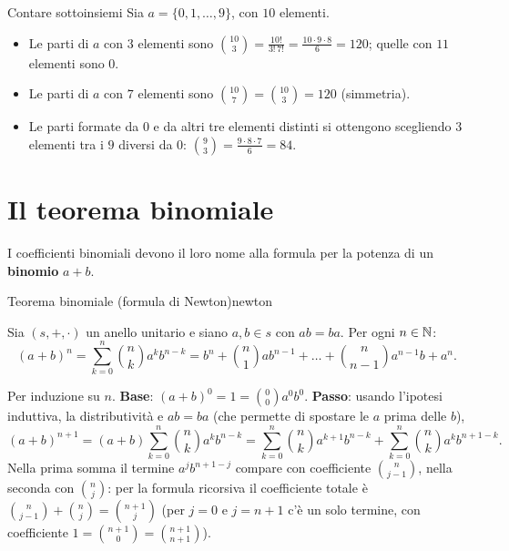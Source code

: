 \begin{esempio}{Contare sottoinsiemi}
    Sia $a = \{0, 1, \dots, 9\}$, con $10$ elementi.
    \begin{itemize}
        \item Le parti di $a$ con $3$ elementi sono $\binom{10}{3} = \frac{10!}{3!\,7!} = \frac{10 \cdot 9 \cdot 8}{6} = 120$; quelle con $11$ elementi sono $0$.
        \item Le parti di $a$ con $7$ elementi sono $\binom{10}{7} = \binom{10}{3} = 120$ (simmetria).
        \item Le parti formate da $0$ e da altri tre elementi distinti si ottengono scegliendo $3$ elementi tra i $9$ diversi da $0$:
              $\binom{9}{3} = \frac{9 \cdot 8 \cdot 7}{6} = 84$.
    \end{itemize}
\end{esempio}

\section{Il teorema binomiale}\label{sec:newton}

I coefficienti binomiali devono il loro nome alla formula per la potenza di un \textbf{binomio} $a + b$.

\begin{concetto}
\begin{Teorema}{Teorema binomiale (formula di Newton)}{newton}
    \begin{prerequisiti}
    \end{prerequisiti}
    Sia $(s, +, \cdot)$ un anello unitario e siano $a, b \in s$ con $ab = ba$. Per ogni $n \in \mathbb{N}$:
    \[ (a + b)^n = \sum_{k = 0}^{n} \binom{n}{k} a^k b^{n - k} = b^n + \binom{n}{1} a b^{n - 1} + \dots + \binom{n}{n - 1} a^{n - 1} b + a^n. \]
\end{Teorema}
\begin{dimostrazione}
    \facoltativa
    Per induzione su $n$. \textbf{Base}: $(a + b)^0 = 1 = \binom{0}{0} a^0 b^0$. \textbf{Passo}: usando l'ipotesi induttiva, la distributività e
    $ab = ba$ (che permette di spostare le $a$ prima delle $b$),
    \[ (a + b)^{n + 1} = (a + b)\sum_{k = 0}^{n} \binom{n}{k} a^k b^{n - k} = \sum_{k = 0}^{n} \binom{n}{k} a^{k + 1} b^{n - k} + \sum_{k = 0}^{n} \binom{n}{k} a^k b^{n + 1 - k}. \]
    Nella prima somma il termine $a^j b^{n + 1 - j}$ compare con coefficiente $\binom{n}{j - 1}$, nella seconda con $\binom{n}{j}$: per la formula
    ricorsiva il coefficiente totale è $\binom{n}{j - 1} + \binom{n}{j} = \binom{n + 1}{j}$ (per $j = 0$ e $j = n + 1$ c'è un solo termine, con coefficiente
    $1 = \binom{n + 1}{0} = \binom{n + 1}{n + 1}$).
\end{dimostrazione}
\end{concetto}

